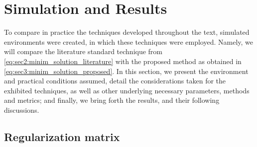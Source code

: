 \section{Simulation and Results}
\label{sec:simulation_and_results}
\def\sympath{h386f}


To compare in practice the techniques developed throughout the text, simulated environments were created, in which these techniques were employed. Namely, we will compare the literature standard technique from \cref{eq:sec2:minim_solution_literature} with the proposed method as obtained in \cref{eq:sec3:minim_solution_proposed}. In this section, we present the environment and practical conditions assumed, detail the considerations taken for the exhibited techniques, as well as other underlying necessary parameters, methods and metrics; and finally, we bring forth the results, and their following discussions.

\subsection{Regularization matrix}

